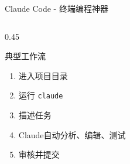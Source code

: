 \documentclass[aspectratio=169,11pt]{beamer}
\begin{document}
\begin{frame}[fragile]{Claude Code - 终端编程神器}
\begin{columns}
\begin{column}{0.45\textwidth}
            \vspace{0.3cm}
            \begin{exampleblock}{典型工作流}
                \begin{enumerate}
                    \item 进入项目目录
                    \item 运行 \texttt{claude}
                    \item 描述任务
                    \item Claude自动分析、编辑、测试
                    \item 审核并提交
                \end{enumerate}
            \end{exampleblock}
        \end{column}
    \end{columns}
\end{frame}
\end{document}
